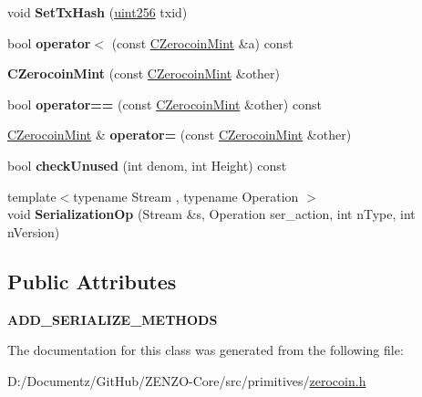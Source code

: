 \begin{DoxyCompactItemize}
void {\bfseries Set\+Tx\+Hash} (\mbox{\hyperlink{classuint256}{uint256}} txid)
\item 
\mbox{\label{class_c_zerocoin_mint_a10467ce5cc59b094b44db9735693de8e}} 
bool {\bfseries operator$<$} (const \mbox{\hyperlink{class_c_zerocoin_mint}{C\+Zerocoin\+Mint}} \&a) const
\item 
\mbox{\label{class_c_zerocoin_mint_a8afb621c6d895c04e2ebcdb66346e7cf}} 
{\bfseries C\+Zerocoin\+Mint} (const \mbox{\hyperlink{class_c_zerocoin_mint}{C\+Zerocoin\+Mint}} \&other)
\item 
\mbox{\label{class_c_zerocoin_mint_a766fb8b8917ee0afaa41f49233795e07}} 
bool {\bfseries operator==} (const \mbox{\hyperlink{class_c_zerocoin_mint}{C\+Zerocoin\+Mint}} \&other) const
\item 
\mbox{\label{class_c_zerocoin_mint_a855136e027945ccacebc50745f1757fe}} 
\mbox{\hyperlink{class_c_zerocoin_mint}{C\+Zerocoin\+Mint}} \& {\bfseries operator=} (const \mbox{\hyperlink{class_c_zerocoin_mint}{C\+Zerocoin\+Mint}} \&other)
\item 
\mbox{\label{class_c_zerocoin_mint_a80abac803dd79861be847593d0664682}} 
bool {\bfseries check\+Unused} (int denom, int Height) const
\item 
\mbox{\label{class_c_zerocoin_mint_af1821fbf2a26c83d990082594d840e36}} 
{\footnotesize template$<$typename Stream , typename Operation $>$ }\\void {\bfseries Serialization\+Op} (Stream \&s, Operation ser\+\_\+action, int n\+Type, int n\+Version)
\end{DoxyCompactItemize}
\subsection*{Public Attributes}
\begin{DoxyCompactItemize}
\item 
\mbox{\label{class_c_zerocoin_mint_a3efd5c6af864a1bb2532b67f43f10b39}} 
{\bfseries A\+D\+D\+\_\+\+S\+E\+R\+I\+A\+L\+I\+Z\+E\+\_\+\+M\+E\+T\+H\+O\+DS}
\end{DoxyCompactItemize}


The documentation for this class was generated from the following file\+:\begin{DoxyCompactItemize}
\item 
D\+:/\+Documentz/\+Git\+Hub/\+Z\+E\+N\+Z\+O-\/\+Core/src/primitives/\mbox{\hyperlink{zerocoin_8h}{zerocoin.\+h}}\end{DoxyCompactItemize}
